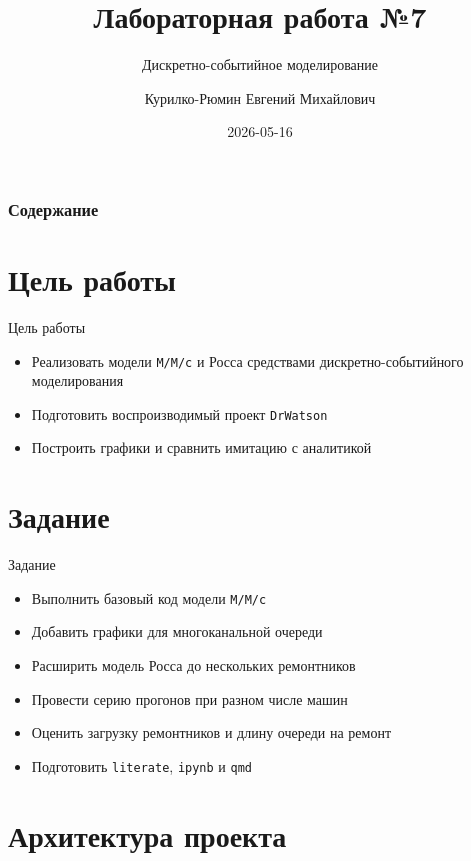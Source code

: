 \documentclass[
  ignorenonframetext,
  aspectratio=169,
  russian,
]{beamer}
\title{Лабораторная работа №7}
\subtitle{Дискретно-событийное моделирование}
\author{Курилко-Рюмин Евгений Михайлович}
\date{2026-05-16}
\providecommand{\tightlist}{%
  \setlength{\itemsep}{0pt}\setlength{\parskip}{0pt}}\usepackage{longtable,booktabs,array}
\renewcommand*\contentsname{Содержание}
\newcommand\contentsname{Содержание}
\begin{document}
\frame{\titlepage}

\renewcommand*\contentsname{Содержание}
\begin{frame}[allowframebreaks]
  \frametitle{Содержание}
  \setcounter{tocdepth}{1}
  \tableofcontents
\end{frame}

\section{Цель
работы}\label{ux446ux435ux43bux44c-ux440ux430ux431ux43eux442ux44b}

\begin{frame}[fragile]{Цель работы}
\begin{itemize}[<+->]
\tightlist
\item
  Реализовать модели \texttt{M/M/c} и Росса средствами
  дискретно-событийного моделирования
\item
  Подготовить воспроизводимый проект \texttt{DrWatson}
\item
  Построить графики и сравнить имитацию с аналитикой
\end{itemize}
\end{frame}

\section{Задание}\label{ux437ux430ux434ux430ux43dux438ux435}

\begin{frame}[fragile]{Задание}
\begin{itemize}[<+->]
\tightlist
\item
  Выполнить базовый код модели \texttt{M/M/c}
\item
  Добавить графики для многоканальной очереди
\item
  Расширить модель Росса до нескольких ремонтников
\item
  Провести серию прогонов при разном числе машин
\item
  Оценить загрузку ремонтников и длину очереди на ремонт
\item
  Подготовить \texttt{literate}, \texttt{ipynb} и \texttt{qmd}
\end{itemize}
\end{frame}

\section{Архитектура
проекта}\label{ux430ux440ux445ux438ux442ux435ux43aux442ux443ux440ux430-ux43fux440ux43eux435ux43aux442ux430}
\end{document}
